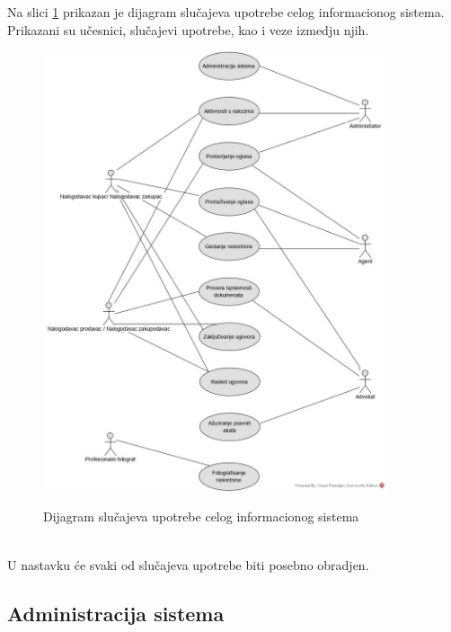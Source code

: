 \documentclass[20pt]{article}
\begin{document}
Na slici \ref{fig:dijagramSlucajevaUpotrebeCelogIS} prikazan je dijagram slu\v{c}ajeva upotrebe celog informacionog sistema. Prikazani su u\v{c}esnici, slu\v{c}ajevi upotrebe, kao i veze izme{dj}u njih.\\
\begin{figure}[h]
        \centering
        \includegraphics[width=0.9\textwidth,height=0.74\textheight]{Pictures/DijagramSlucajevaUpotrebeCelogInformacionogSistema}\\
        \caption{Dijagram slu\v{c}ajeva upotrebe celog informacionog sistema}
        \label{fig:dijagramSlucajevaUpotrebeCelogIS}
    \end{figure}\\
U nastavku \'{c}e svaki od slu\v{c}ajeva upotrebe biti posebno obra{dj}en.

\newpage
\subsection{\bfseries \Large Administracija sistema}
\setlength{\parindent}{1cm}
\fontsize{13}{18} \selectfont 
\end{document}
